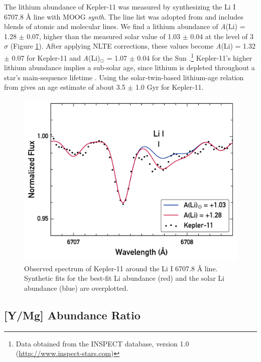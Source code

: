 \documentclass[twocolumn,trackchanges]{aastex61}
\begin{document}
The lithium abundance of Kepler-11 was measured by synthesizing the Li I 6707.8 \r{A} line with MOOG \textit{synth}. The line list was adopted from \citet{Melendez2012} and includes blends of atomic and molecular lines. We find a lithium abundance of \textit{A}(Li) = 1.28 $\pm$ 0.07, higher than the measured solar value of 1.03 $\pm$ 0.04 at the level of 3$\sigma$ (Figure \ref{fig:lithium}). After applying NLTE corrections, these values become \textit{A}(Li) = 1.32 $\pm$ 0.07 for Kepler-11 and \textit{A}(Li)$_{\odot}$ = 1.07 $\pm$ 0.04 for the Sun \citep{Lind2009}.\footnote{Data obtained from the INSPECT database, version 1.0 (\url{http://www.inspect-stars.com})} Kepler-11's higher lithium abundance implies a sub-solar age, since lithium is depleted throughout a star's main-sequence lifetime \citep{Duncan1981}. Using the solar-twin-based lithium-age relation from \citet{Carlos2016} gives an age estimate of about 3.5 $\pm$ 1.0 Gyr for Kepler-11.

\begin{figure}
\centering
\includegraphics[width=\columnwidth]{lithium}
\caption{Observed spectrum of Kepler-11 around the Li I 6707.8 \r{A} line. Synthetic fits for the best-fit Li abundance (red) and the solar Li abundance (blue) are overplotted.}
\label{fig:lithium}
\end{figure}

\vspace{8mm}


\subsection{[Y/Mg] Abundance Ratio}
\end{document}
